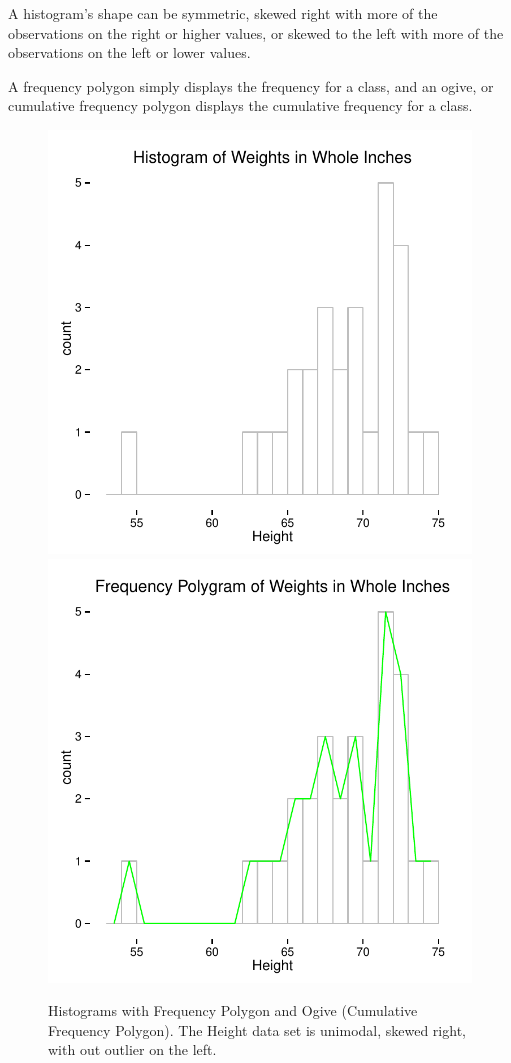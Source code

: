 \documentclass[nohyper,justified]{tufte-handout}\usepackage[]{graphicx}\usepackage[]{color}
\newenvironment{knitrout}{}{} %
\begin{document}
A histogram's shape can be symmetric, skewed right with more of the observations on the right or higher values, or skewed to the left with more of the observations on the left or lower values.

A frequency polygon simply displays the frequency for a class, and an ogive, or cumulative frequency polygon displays the cumulative frequency for a class. 

\begin{knitrout}
\color{fgcolor}\begin{figure}

{\centering \includegraphics[width=.49\linewidth]{figure/graphics-histogram-1} 
\includegraphics[width=.49\linewidth]{figure/graphics-histogram-2} 

}

\caption[Histograms with Frequency Polygon and Ogive (Cumulative Frequency Polygon)]{Histograms with Frequency Polygon and Ogive (Cumulative Frequency Polygon). The Height data set is unimodal, skewed right, with out outlier on the left. }\label{fig:histogram}
\end{figure}


\end{knitrout}
\end{document}
